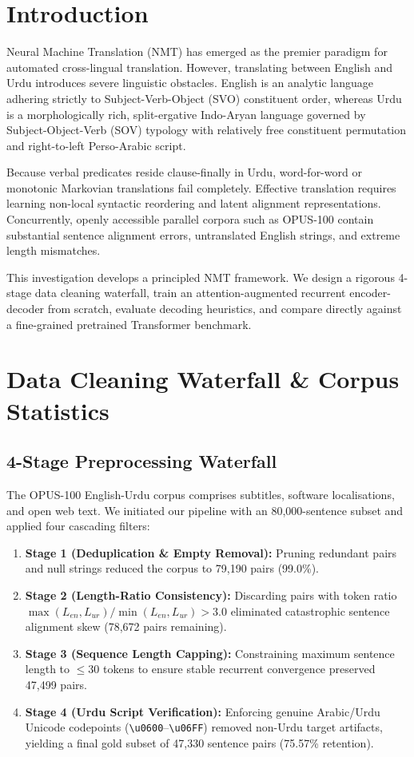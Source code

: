 \documentclass[conference]{IEEEtran}
\begin{document}
\section{Introduction}
Neural Machine Translation (NMT) has emerged as the premier paradigm for automated cross-lingual translation. However, translating between English and Urdu introduces severe linguistic obstacles. English is an analytic language adhering strictly to Subject-Verb-Object (SVO) constituent order, whereas Urdu is a morphologically rich, split-ergative Indo-Aryan language governed by Subject-Object-Verb (SOV) typology with relatively free constituent permutation and right-to-left Perso-Arabic script.

Because verbal predicates reside clause-finally in Urdu, word-for-word or monotonic Markovian translations fail completely. Effective translation requires learning non-local syntactic reordering and latent alignment representations. Concurrently, openly accessible parallel corpora such as OPUS-100 contain substantial sentence alignment errors, untranslated English strings, and extreme length mismatches.

This investigation develops a principled NMT framework. We design a rigorous 4-stage data cleaning waterfall, train an attention-augmented recurrent encoder-decoder from scratch, evaluate decoding heuristics, and compare directly against a fine-grained pretrained Transformer benchmark.

\section{Data Cleaning Waterfall \& Corpus Statistics}
\subsection{4-Stage Preprocessing Waterfall}
The OPUS-100 English-Urdu corpus comprises subtitles, software localisations, and open web text. We initiated our pipeline with an 80,000-sentence subset and applied four cascading filters:
\begin{enumerate}
    \item \textbf{Stage 1 (Deduplication \& Empty Removal):} Pruning redundant pairs and null strings reduced the corpus to 79,190 pairs (99.0\%).
    \item \textbf{Stage 2 (Length-Ratio Consistency):} Discarding pairs with token ratio $\max(L_{en}, L_{ur}) / \min(L_{en}, L_{ur}) > 3.0$ eliminated catastrophic sentence alignment skew (78,672 pairs remaining).
    \item \textbf{Stage 3 (Sequence Length Capping):} Constraining maximum sentence length to $\le 30$ tokens to ensure stable recurrent convergence preserved 47,499 pairs.
    \item \textbf{Stage 4 (Urdu Script Verification):} Enforcing genuine Arabic/Urdu Unicode codepoints (\texttt{\textbackslash u0600}--\texttt{\textbackslash u06FF}) removed non-Urdu target artifacts, yielding a final gold subset of 47,330 sentence pairs (75.57\% retention).
\end{enumerate}
\end{document}
